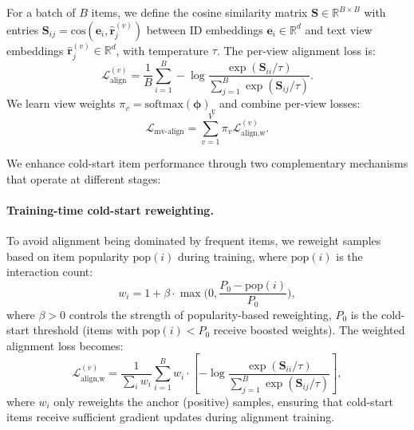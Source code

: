 \documentclass[sigconf,natbib=true,anonymous]{acmart}
\begin{document}
For a batch of $B$ items, we define
the cosine similarity matrix
$\mathbf{S} \in \mathbb{R}^{B \times B}$ with entries
$\mathbf{S}_{ij} = \mathrm{cos}(\mathbf{e}_{i},
\hat{\mathbf{r}}_{j}^{(v)})$ between ID embeddings
$\mathbf{e}_i \in \mathbb{R}^d$ and text view embeddings
$\hat{\mathbf{r}}_j^{(v)} \in \mathbb{R}^d$, with temperature $\tau$.
The per-view alignment loss is:
\begin{equation}
  \mathcal{L}_{\text{align}}^{(v)} =
  \frac{1}{B}\sum_{i=1}^{B}
  -\log \frac{\exp(\mathbf{S}_{ii}/\tau)}{\sum_{j=1}^{B}\exp(\mathbf{S}_{ij}/\tau)}.
\end{equation}
We learn view weights $\pi_v=\mathrm{softmax}(\boldsymbol{\phi})_v$
and combine per-view losses:
\begin{equation}
  \mathcal{L}_{\text{mv-align}} = \sum_{v=1}^{V}\pi_v \mathcal{L}_{\text{align,w}}^{(v)}.
\end{equation}

We enhance cold-start item performance through two complementary
mechanisms that operate at different stages:

\paragraph{Training-time cold-start reweighting.}
To avoid alignment being dominated by frequent items, we
reweight samples based on item popularity $\mathrm{pop}(i)$
during training, where $\mathrm{pop}(i)$ is the interaction count:
\begin{equation}
  w_i = 1 + \beta\cdot \max\Big(0, \frac{P_0-\mathrm{pop}(i)}{P_0}\Big),
  \label{eq:cold_reweight}
\end{equation}
where $\beta>0$ controls the strength of popularity-based reweighting,
$P_0$ is the cold-start threshold (items with $\mathrm{pop}(i) < P_0$
receive boosted weights). The weighted alignment loss becomes:
\begin{equation}
  \mathcal{L}_{\text{align,w}}^{(v)} =
  \frac{1}{\sum_i w_i}\sum_{i=1}^{B} w_i \cdot
  \left[-\log \frac{\exp(\mathbf{S}_{ii}/\tau)}{\sum_{j=1}^{B}\exp(\mathbf{S}_{ij}/\tau)}\right],
\end{equation}
where $w_i$ only reweights the anchor (positive) samples, ensuring
that cold-start items receive sufficient gradient updates during
alignment training.
\end{document}
